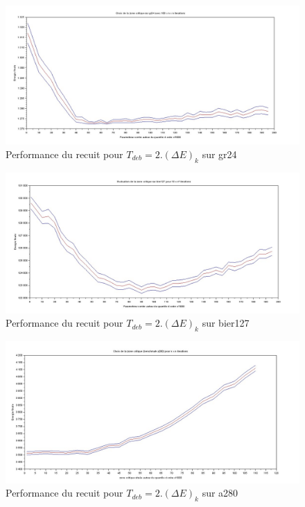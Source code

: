 \documentclass{article}%
\begin{document}
	\begin{figure}[!h]
	\begin{center}
	\includegraphics[scale=0.25]{gr24_zonecritique.jpg}
	\caption{Performance du recuit pour $ T_{deb} = 2. (\Delta E)_{k} $ sur gr24}
	\label{gr24_zone}
	\end{center}
	\end{figure}
	
	\begin{figure}[!h]
	\begin{center}
	\includegraphics[scale=0.25]{bier127_zonecritique.jpg}
	\caption{Performance du recuit pour $ T_{deb} = 2. (\Delta E)_{k} $ sur bier127}
	\label{bier127_zone}
	\end{center}
	\end{figure}
	
	\begin{figure}[!h]
	\begin{center}
	\includegraphics[scale=0.25]{a280_zonecritique.jpg}
	\caption{Performance du recuit pour $ T_{deb} = 2. (\Delta E)_{k} $ sur a280}
	\label{a280_zone}
	\end{center}
	\end{figure}
		
\end{document}
